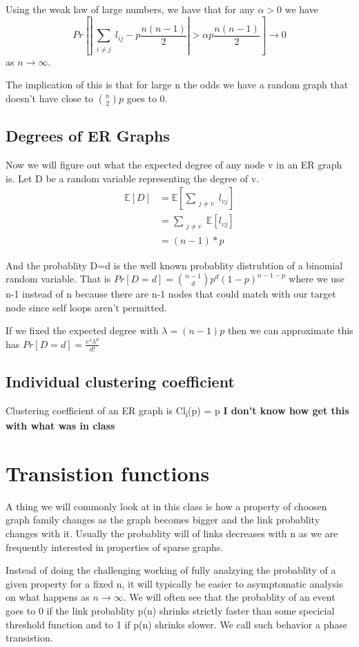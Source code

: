 \documentclass[11pt]{article}
\newcommand\ssum[1]{\sum_{\substack{#1}}}
\newcommand\E{\mathbb{E}}
\begin{document}
Using the weak law of large numbers, we have that for any \(\alpha > 0\) we have
$$Pr[\left| \ssum{i \neq j} l_{ij} - p \frac{n(n-1)}{2} \right|  > \alpha p \frac{n(n-1)}{2} ] \to 0$$
as \(n \to \infty\).

The implication of this is that for large n the odds we have a random graph that doesn't have close to \(\binom{n}{2}p\) goes to 0.

\subsection{Degrees of ER Graphs}
\label{sec:orgbbc69c2}
Now we will figure out what the expected degree of any node v in an ER graph is. Let D be a random variable representing the degree of v.
\begin{align}
\E[D] &= \E[\ssum{j\neq v} l_{{vj} }] \\
&= \ssum{j\neq v} \E [ l_{vj} ] \\
&= (n-1)*p
\end{align}

And the probablity D=d is the well known probablity distrubtion of a binomial random variable. That is \(Pr[D=d] = \binom{n-1}{d} p^{d} (1-p)^{n-1-p}\) where we use n-1 instead of n because there are n-1 nodes that could match with our target node since self loops aren't permitted.

If we fixed the expected degree with \(\lambda = (n-1)p\) then we can approximate this has \(Pr[D=d] = \frac{e^\lambda \lambda^{d}}{d!}\)



\subsection{Individual clustering coefficient}
\label{sec:orga5bfc09}
Clustering coefficient of an ER graph is Cl\textsubscript{i}(p) = p
\textbf{I don't know how get this with what was in class}

\section{Transistion functions}
\label{sec:org1afbe23}
A thing we will commonly look at in this class is how a property of choosen graph family changes as the graph becomes bigger and the link probablity changes with it. Usually the probablity will of links decreases with n as we are frequently interested in properties of sparse graphs.

Instead of doing the challenging working of fully analzying the probablity of a given property for a fixed n, it will typically be easier to asymptomatic analysis on what happens as \(n\to \infty\). We will often see that the probablity of an event goes to 0 if the link probablity p(n) shrinks strictly faster than some specicial threshold function and to 1 if p(n) shrinks slower. We call such behavior a phase transistion.
\end{document}
